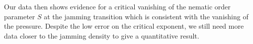 \documentclass[class=article, float=false, crop=false]{standalone}
\begin{document}
Our data then shows evidence for a critical vanishing of the nematic order parameter $S$ at the jamming transition which is consistent with the vanishing of the pressure. Despite the low error on the critical exponent, we still need more data closer to the jamming density to give a quantitative result.

% 
\end{document}
